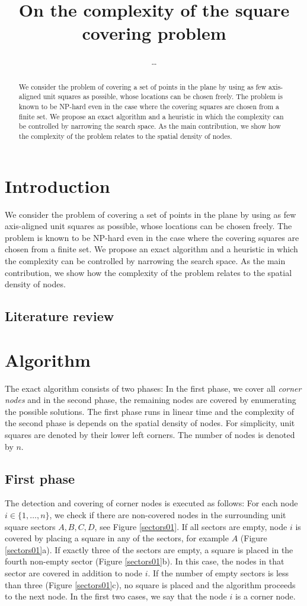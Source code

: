 \documentclass{article}
\title{On the complexity of the square covering problem}
\author{\ldots}
\begin{document}
\maketitle
\begin{abstract}
We consider the problem of covering a set of points in the plane by 
using as few axis-aligned unit squares as possible, whose locations can be chosen freely. 
The problem is known to be NP-hard even in the case where the covering 
squares are chosen from a finite set. We propose an exact algorithm and a heuristic
in which the complexity can be controlled by narrowing the search space.
As the main contribution, we show how the complexity of the problem relates to the 
spatial density of nodes.
\end{abstract}
\section{Introduction}
We consider the problem of covering a set of points in the plane by 
using as few axis-aligned unit squares as possible, whose locations can be chosen freely. 
The problem is known to be NP-hard even in the case where the covering 
squares are chosen from a finite set. We propose an exact algorithm and a heuristic
in which the complexity can be controlled by narrowing the search space.
As the main contribution, we show how the complexity of the problem relates to the 
spatial density of nodes.

\subsection{Literature review}

\section{Algorithm}
The exact algorithm consists of two phases: In the first phase, we cover all \emph{corner nodes} 
and in the second phase, the remaining nodes are covered by enumerating the
possible solutions. The first phase runs in linear time and the complexity of the 
second phase is depends on the spatial density of nodes. For simplicity, unit squares 
are denoted by their lower left corners. The number of nodes is denoted by $n$.
\subsection{First phase}
The detection and covering of corner nodes is executed as follows: For each node $i \in \{1,\ldots,n\}$,
we check if there are non-covered nodes in the surrounding unit square sectors $A,B,C,D$, see Figure \ref{sectors01}. 
If all sectors are empty, node $i$ is covered by placing a square in any of the
sectors, for example $A$ (Figure \ref{sectors01}a). If exactly three of the sectors are empty, a square is placed in the fourth non-empty sector (Figure \ref{sectors01}b). 
In this case, the nodes in that sector are covered in addition to node $i$.
If the number of empty sectors is less than three (Figure \ref{sectors01}c), no square is placed and 
the algorithm proceeds to the next node.
In the first two cases, we say that the node $i$ is a corner node.
\end{document}
